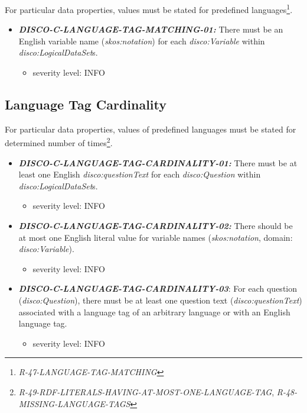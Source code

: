 \documentclass{llncs}
\begin{document}
For particular data properties, values must be stated for predefined languages\footnote{{\em R-47-LANGUAGE-TAG-MATCHING}}.

\begin{itemize}
	\item \textbf{{\em DISCO-C-LANGUAGE-TAG-MATCHING-01:}}
There must be an English variable name ({\em skos:notation}) for each {\em disco:Variable} within {\em disco:LogicalDataSet}s.
\begin{itemize}
	\item severity level: INFO
\end{itemize}
\end{itemize}

\subsection{Language Tag Cardinality}

For particular data properties, values of predefined languages must be stated for determined number of times\footnote{{\em R-49-RDF-LITERALS-HAVING-AT-MOST-ONE-LANGUAGE-TAG}, {\em R-48-MISSING-LANGUAGE-TAGS}}.

\begin{itemize}

	\item \textbf{{\em DISCO-C-LANGUAGE-TAG-CARDINALITY-01:}}
  There must be at least one English {\em disco:questionText} for each {\em disco:Question} within {\em disco:LogicalDataSet}s.
\begin{itemize}
	\item severity level: INFO
\end{itemize}
  \item \textbf{{\em DISCO-C-LANGUAGE-TAG-CARDINALITY-02:}}
  There should be at most one English literal value for variable names ({\em skos:notation}, domain: {\em disco:Variable}).
\begin{itemize}
	\item severity level: INFO
\end{itemize}
  \item \textbf{{\em DISCO-C-LANGUAGE-TAG-CARDINALITY-03}}:
	For each question (\emph{disco:Question}), there must be at least one question text (\emph{disco:questionText}) associated with a language tag of an arbitrary language or with an English language tag.
\begin{itemize}
	\item severity level: INFO
\end{itemize}
\end{itemize}
\end{document}
